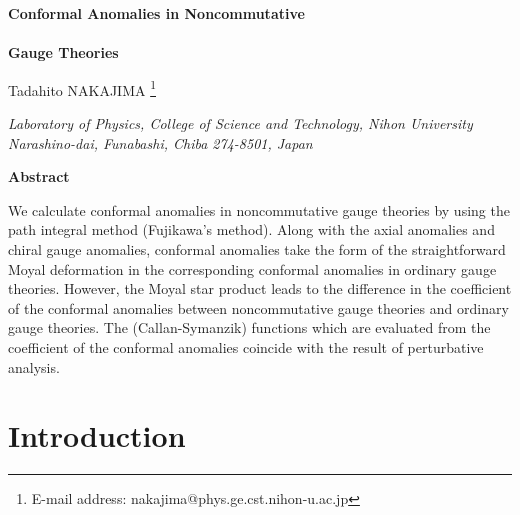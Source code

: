 \documentclass[a4paper,12pt]{article}
\begin{document}
%
\renewcommand{\theequation}
{\thesection.\arabic{equation}}
%
\thispagestyle{empty}
\vspace*{20mm} 
%
\begin{center}
{\LARGE {\bf Conformal Anomalies in Noncommutative}} \\
 \qquad \\
{\LARGE {\bf Gauge Theories}} \\


\vspace*{20mm}

\renewcommand{\thefootnote}{\fnsymbol{footnote}}

{\Large Tadahito NAKAJIMA 
\footnote[1]{E-mail address: nakajima@phys.ge.cst.nihon-u.ac.jp}} \\
%
%
\vspace*{20mm}


{\large {\it Laboratory of Physics, College of Science and Technology, 
Nihon University}} \\
{\large {\it Narashino-dai, Funabashi, Chiba 274-8501, Japan}} \\ 

\vspace*{20mm}

{\bf Abstract} \\

\end{center}


We calculate conformal anomalies in noncommutative gauge theories by using the 
path integral method (Fujikawa's method). Along with the axial anomalies and 
chiral gauge anomalies, conformal anomalies take the form of the 
straightforward Moyal deformation in the corresponding conformal anomalies in 
ordinary gauge theories. However, the Moyal star product leads to the 
difference in the coefficient of the conformal anomalies between 
noncommutative gauge theories and ordinary gauge theories. 
The \myHighlight{$\beta$}\coordHE{} (Callan-Symanzik) functions which are evaluated from the 
coefficient of the conformal anomalies coincide with the result of 
perturbative analysis. 


\vspace*{15mm}


\clearpage
%

%
%
\section{Introduction}
\setcounter{page}{1}
\setcounter{equation}{0}
\end{document}
